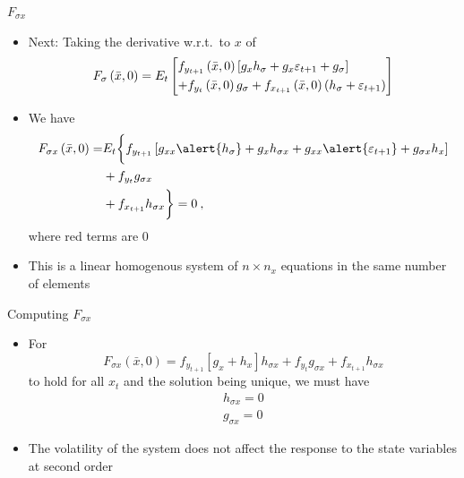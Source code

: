 \begin{frame}{$F_{\sigma x}$}
  \begin{itemize}
    \item Next: Taking the derivative w.r.t.\ to $x$ of
          \[{F_\sigma }\left( {\bar x,0} \right) = {E_t}\left[ \begin{gathered}
                {f_{{y_{t + 1}}}}\left( {\bar x,0} \right)\left[ {{g_x}{h_\sigma } + {g_x}{\varepsilon _{t + 1}} + {g_\sigma }} \right] \hfill \\
                + {f_{{y_t}}}\left( {\bar x,0} \right){g_\sigma } + {f_{{x_{t + 1}}}}\left( {\bar x,0} \right)\left( {{h_\sigma } + {\varepsilon _{t + 1}}} \right) \hfill \\
              \end{gathered}  \right]\]
    \item We have
          \begin{align}
            {F_{\sigma x}}\left( {\bar x,0} \right) = & E_t\biggl\{ {f_{{y_{t + 1}}}}\left[ {{g_{xx}}\alert{h_\sigma } + {g_x}{h_{\sigma x}} + {g_{xx}}\alert{\varepsilon _{t + 1}} + {g_{\sigma x}}{h_x}} \right] \notag \\
                                                      & + {f_{{y_t}}}{g_{\sigma x}} \notag                                                                                                                                \\
                                                      & + {f_{{x_{t + 1}}}}{h_{\sigma x}}\biggr\}=0  \: ,
          \end{align}
          where red terms are 0
    \item This is a linear homogenous system of $n \times n_x$ equations in the same number of elements
  \end{itemize}
\end{frame}

\begin{frame}{Computing $F_{\sigma x}$}
  \begin{itemize}
    \item For
          \[{F_{\sigma x}}\left( {\bar x,0} \right) = {f_{{y_{t + 1}}}}\left[ {{g_x} + {h_x}} \right]{h_{\sigma x}} + {f_{{y_t}}}{g_{\sigma x}} + {f_{{x_{t + 1}}}}{h_{\sigma x}}\]
          to hold for all $x_t$ and the solution being unique, we must have
          \begin{align}
            {h_{\sigma x}} = 0 \\
            {g_{\sigma x}} = 0
          \end{align}
    \item The volatility of the system does not affect the response to the state variables at second order
  \end{itemize}
\end{frame}

